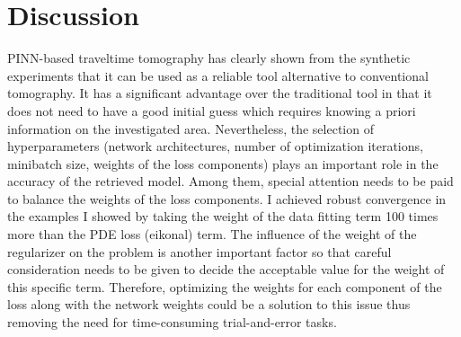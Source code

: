 \section{Discussion}
\label{sec:discussion}

PINN-based traveltime tomography has clearly shown from the synthetic experiments that it can be used as a reliable tool alternative to conventional tomography. It has a significant advantage over the traditional tool in that it does not need to have a good initial guess which requires knowing a priori information on the investigated area. Nevertheless, the selection of hyperparameters (network architectures,  number of optimization iterations, minibatch size, weights of the loss components) plays an important role in the accuracy of the retrieved model. Among them, special attention needs to be paid to balance the weights of the loss components. I achieved robust convergence in the examples I showed by taking the weight of the data fitting term 100 times more than the PDE loss (eikonal) term. The influence of the weight of the regularizer on the problem is another important factor so that careful consideration needs to be given to decide the acceptable value for the weight of this specific term.  Therefore, optimizing the weights for each component of the loss along with the network weights could be a solution to this issue thus removing the need for time-consuming trial-and-error tasks.